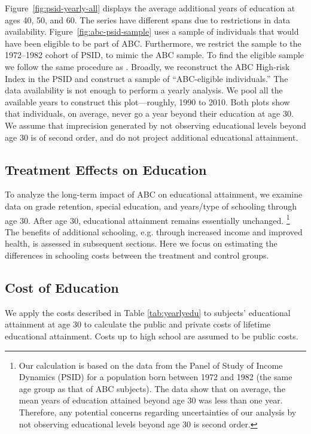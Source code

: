 \noindent Figure~\ref{fig:psid-yearly-all} displays the average additional years of education at ages 40, 50, and 60. The series have different spans due to restrictions in data availability. Figure~\ref{fig:abc-psid-sample} uses a sample of individuals that would have been eligible to be part of ABC. Furthermore, we restrict the sample to the 1972--1982 cohort of PSID, to mimic the ABC sample. To find the eligible sample we follow the same procedure as \citet{Garcia_Heckman_2014_AbilityCharacter}. Broadly, we reconstruct the ABC High-risk Index in the PSID and construct a sample of ``ABC-eligible individuals.'' The data availability is not enough to perform a yearly analysis. We pool all the available years to construct this plot---roughly, 1990 to 2010. Both plots show that individuals, on average, never go a year beyond their education at age 30. We assume that imprecision generated by not observing educational levels beyond age 30 is of second order, and do not project additional educational attainment. \\


\subsection{Treatment Effects on Education}
\noindent To analyze the long-term impact of ABC on educational attainment,
we examine data on grade retention, special education, and
years/type of schooling through age 30. After age 30,
educational attainment remains essentially
unchanged.%
	\footnote{Our calculation is based on
	the data from the Panel of Study of Income Dynamics (PSID) for a
	population born between 1972 and 1982 (the same age group as that of
	ABC subjects). The data show that on average, the mean years of education attained
	beyond age 30 was less than one year.
	Therefore, any potential concerns regarding uncertainties of our analysis
	by not observing educational levels beyond age 30 is second
	order.}
The benefits of additional schooling, e.g. through
increased income and improved health, is assessed in
subsequent sections. Here we focus on estimating the
differences in schooling costs between the treatment and
control groups. \\

\subsection{Cost of Education}
\noindent We apply the costs described in Table \ref{tab:yearlyedu} to subjects' educational attainment at age 30 to calculate the public and private costs of lifetime educational attainment. Costs up to high school are assumed to be public costs. \\

